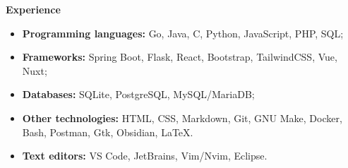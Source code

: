 {\vspace{0.5cm} \hspace{-0.5cm} \Large \textbf{Experience}}

\begin{itemize}
    \item \textbf{Programming languages:} Go, Java, C, Python, JavaScript, PHP, SQL;
    \item \textbf{Frameworks:} Spring Boot, Flask, React, Bootstrap, TailwindCSS, Vue, Nuxt;
    \item \textbf{Databases:} SQLite, PostgreSQL, MySQL/MariaDB;
    \item \textbf{Other technologies:} HTML, CSS, Markdown, Git, GNU Make, Docker, Bash, Postman, Gtk, Obsidian, LaTeX.
    \item \textbf{Text editors:} VS Code, JetBrains, Vim/Nvim, Eclipse.
\end{itemize}